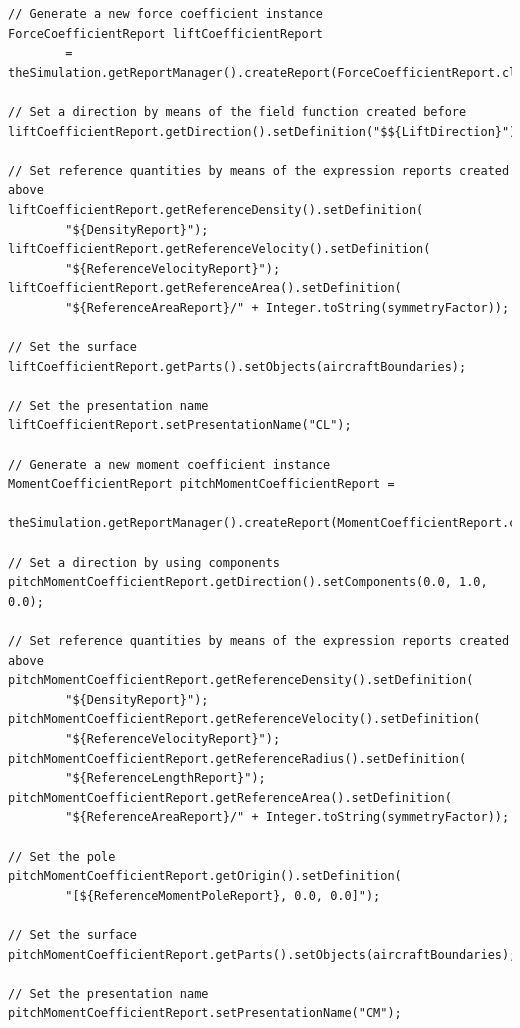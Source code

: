 \begin{lstlisting}[caption={Force and moment coefficients creation}, captionpos=b, tabsize=2, label={lst:createAerodynamicsCoefficients}]
// Generate a new force coefficient instance
ForceCoefficientReport liftCoefficientReport 
		= theSimulation.getReportManager().createReport(ForceCoefficientReport.class);
		
// Set a direction by means of the field function created before	
liftCoefficientReport.getDirection().setDefinition("$${LiftDirection}");

// Set reference quantities by means of the expression reports created above
liftCoefficientReport.getReferenceDensity().setDefinition(
		"${DensityReport}");
liftCoefficientReport.getReferenceVelocity().setDefinition(
		"${ReferenceVelocityReport}");
liftCoefficientReport.getReferenceArea().setDefinition(
		"${ReferenceAreaReport}/" + Integer.toString(symmetryFactor));

// Set the surface
liftCoefficientReport.getParts().setObjects(aircraftBoundaries);

// Set the presentation name
liftCoefficientReport.setPresentationName("CL");

// Generate a new moment coefficient instance
MomentCoefficientReport pitchMomentCoefficientReport = 
		theSimulation.getReportManager().createReport(MomentCoefficientReport.class);

// Set a direction by using components		
pitchMomentCoefficientReport.getDirection().setComponents(0.0, 1.0, 0.0);

// Set reference quantities by means of the expression reports created above
pitchMomentCoefficientReport.getReferenceDensity().setDefinition(
		"${DensityReport}");
pitchMomentCoefficientReport.getReferenceVelocity().setDefinition(
		"${ReferenceVelocityReport}");
pitchMomentCoefficientReport.getReferenceRadius().setDefinition(
		"${ReferenceLengthReport}");
pitchMomentCoefficientReport.getReferenceArea().setDefinition(
		"${ReferenceAreaReport}/" + Integer.toString(symmetryFactor));

// Set the pole
pitchMomentCoefficientReport.getOrigin().setDefinition(
		"[${ReferenceMomentPoleReport}, 0.0, 0.0]");

// Set the surface
pitchMomentCoefficientReport.getParts().setObjects(aircraftBoundaries);

// Set the presentation name
pitchMomentCoefficientReport.setPresentationName("CM");
\end{lstlisting}

